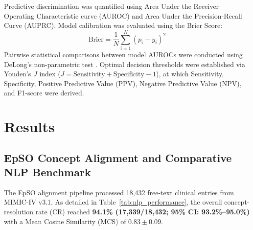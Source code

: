 \documentclass[11pt,a4paper]{article}
\begin{document}
Predictive discrimination was quantified using Area Under the Receiver Operating Characteristic curve (AUROC) and Area Under the Precision-Recall Curve (AUPRC). Model calibration was evaluated using the Brier Score:
\begin{equation}
    \text{Brier} = \frac{1}{N} \sum_{i=1}^N (p_i - y_i)^2
\end{equation}
Pairwise statistical comparisons between model AUROCs were conducted using DeLong's non-parametric test \cite{delong1988comparing}. Optimal decision thresholds were established via Youden's $J$ index ($J = \text{Sensitivity} + \text{Specificity} - 1$), at which Sensitivity, Specificity, Positive Predictive Value (PPV), Negative Predictive Value (NPV), and F1-score were derived.

\section{Results}

\subsection{EpSO Concept Alignment and Comparative NLP Benchmark}
The EpSO alignment pipeline processed 18,432 free-text clinical entries from MIMIC-IV v3.1. As detailed in Table~\ref{tab:nlp_performance}, the overall concept-resolution rate (CR) reached \textbf{94.1\% (17,339/18,432; 95\% CI: 93.2\%--95.0\%)} with a Mean Cosine Similarity (MCS) of $0.83 \pm 0.09$.
\end{document}

